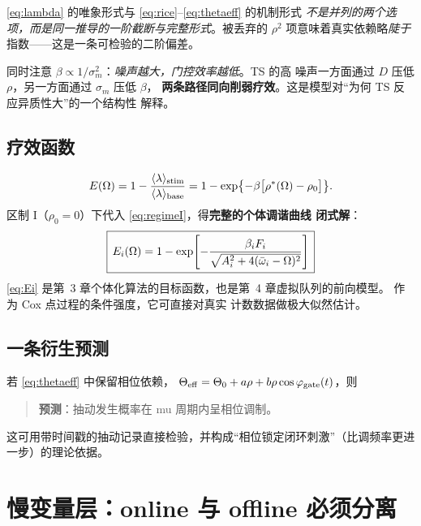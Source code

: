 \begin{remark}[两条链路的统一]\label{rem:unify}
\cref{eq:lambda} 的唯象形式与 \cref{eq:rice}--\cref{eq:thetaeff} 的机制形式
\emph{不是并列的两个选项，而是同一推导的一阶截断与完整形式}。被丢弃的
$\rho^2$ 项意味着真实依赖略\emph{陡于}指数——这是一条可检验的二阶偏差。

同时注意 $\beta\propto1/\sigma_m^2$：\emph{噪声越大，门控效率越低}。TS 的高
噪声一方面通过 $D$ 压低 $\rho$，另一方面通过 $\sigma_m$ 压低 $\beta$，
\textbf{两条路径同向削弱疗效}。这是模型对“为何 TS 反应异质性大”的一个结构性
解释。
\end{remark}

\subsection{疗效函数}
\label{sec:efficacy}

\begin{equation}\label{eq:efficacy}
E(\Omega)=1-\frac{\langle\lambda\rangle_{\mathrm{stim}}}
                {\langle\lambda\rangle_{\mathrm{base}}}
      =1-\exp\bigl\{-\beta\bigl[\rho^{*}(\Omega)-\rho_0\bigr]\bigr\} .
\end{equation}
%
区制 I（$\rho_0=0$）下代入 \cref{eq:regimeI}，得\textbf{完整的个体调谐曲线
闭式解}：
%
\begin{equation}\label{eq:Ei}
\boxed{\,E_i(\Omega)=1-\exp\!\left[-\frac{\beta_iF_i}
       {\sqrt{A_i^2+4(\bar{\omega}_i-\Omega)^2}}\right]\,}
\end{equation}
%
\cref{eq:Ei} 是第~3 章个体化算法的目标函数，也是第~4 章虚拟队列的前向模型。
作为 Cox 点过程的条件强度，它可直接对真实 \TPM{} 计数数据做极大似然估计。

\subsection{一条衍生预测}
\label{sec:phasegate}

若 \cref{eq:thetaeff} 中保留相位依赖，
$\Theta_{\mathrm{eff}}=\Theta_0+a\rho+b\rho\cos\varphi_{\mathrm{gate}}(t)$，则
%
\begin{quote}
\textbf{预测}：抽动发生概率在 mu 周期内呈相位调制。
\end{quote}
%
这可用带时间戳的抽动记录直接检验，并构成“相位锁定闭环刺激”（比调频率更进
一步）的理论依据。

\section{慢变量层：online 与 offline 必须分离}
\label{sec:slow}

